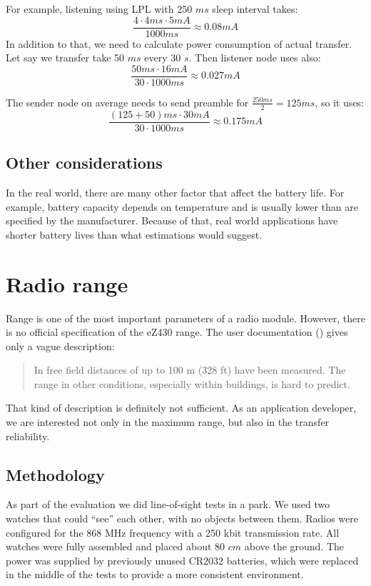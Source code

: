 For example, listening using LPL with 250 $ ms $ sleep interval takes:
$$
\frac{4 \cdot 4 ms \cdot 5 mA}{1000 ms} \approx 0.08 mA
$$
In addition to that, we need to calculate power consumption of actual transfer.
Let say we transfer take 50 $ ms $ every 30 $ s $.
Then listener node uses also:
$$
\frac{50 ms \cdot 16 mA}{30 \cdot 1000 ms} \approx 0.027 mA
$$

The sender node on average needs to send preamble for $ \frac{250 ms}{2} = 125 ms$, so it uses:
$$
\frac{(125 + 50) ms \cdot 30 mA}{30 \cdot 1000 ms} \approx 0.175 mA
$$

\subsection{Other considerations}
In the real world, there are many other factor that affect the battery life.
For example, battery capacity depends on temperature and is usually lower than are specified by the manufacturer.
Because of that, real world applications have shorter battery lives than what estimations would suggest.


\section{Radio range}

Range is one of the most important parameters of a radio module.
However, there is no official specification of the eZ430 range.
The user documentation (\cite{eZ430Chronos}) gives only a vague description:
\begin{quote}
In free field distances of up to 100 m (328 ft) have been measured. The range in other conditions,
especially within buildings, is hard to predict.
\end{quote}

That kind of description is definitely not sufficient.
As an application developer, we are interested not only in the maximum range, but also in the transfer reliability.


\subsection{Methodology}

As part of the evaluation we did line-of-sight tests in a park.
We used two watches that could ``see'' each other, with no objects between them.
Radios were configured for the 868 MHz frequency with a 250 kbit transmission rate.
All watches were fully assembled and placed about 80 $ cm $ above the ground.
The power was supplied by previously unused CR2032 batteries, which were replaced in the middle of the tests to provide a more consistent environment.


